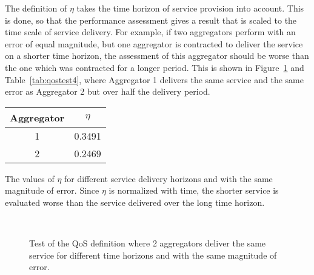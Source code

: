 The definition of $\eta$ takes the time horizon of service provision into account. This is done, so that the performance assessment gives a result that is scaled to the time scale of service delivery. For example, if two aggregators perform with an error of equal magnitude, but one aggregator is contracted to deliver the service on a shorter time horizon, the assessment of this aggregator should be worse than the one which was contracted for a longer period. This is shown in Figure~\ref{fig:indextest4} and Table~\ref{tab:qostest4}, where Aggregator 1 delivers the same service and the same error as Aggregator 2 but over half the delivery period.
\begin{margintable}[-1\baselineskip]%
	\centering
	\begin{tabular}{cc}
		\toprule
		Aggregator & $\eta$ \\
		\midrule
		1 & 0.3491 \\
		2 & 0.2469 \\
		\bottomrule
	\end{tabular}
	\caption{The values of $\eta$ for different service delivery horizons and with the same magnitude of error. Since $\eta$ is normalized with time, the shorter service is evaluated worse than the service delivered over the long time horizon.}
	\label{tab:qostest4}
\end{margintable}

\begin{figure}
\centering
{}\\
\caption{Test of the QoS definition where 2 aggregators deliver the same service for different time horizons and with the same magnitude of error.}
\label{fig:indextest4}
\end{figure}

